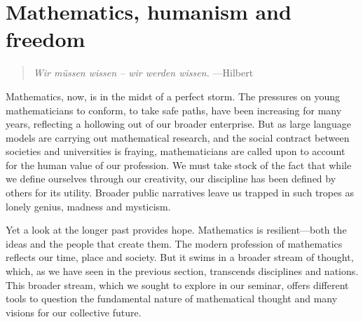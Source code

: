 \documentclass{article}
\begin{document}
    
  
    
%
%
%
%
%
    

%
%
%
%
%
%
  

%
%



%

   


%



%
%




 

 


%

 
%

%

%
%
%

 







 
%
%
%
%
%

%

 

 
\section{Mathematics, humanism and freedom} 
\begin{quote}
    {\em Wir m\"{u}ssen wissen – wir werden wissen.\/} ---Hilbert~\cite{hilbert_naturkennen}
\end{quote}
 

Mathematics, now, is in the midst of a perfect storm. The pressures on young mathematicians to conform, to take safe paths, have been increasing for many years, reflecting a hollowing out of our broader enterprise. But as large language models are carrying out mathematical research, and the social contract between societies and universities is fraying, mathematicians are called upon to account for the human value of our profession. We must take stock of the fact that while we define ourselves through our creativity, our discipline has been defined by others for its utility. Broader public narratives leave us trapped in such tropes as lonely genius, madness and mysticism.

 

 
Yet a look at the longer past provides hope. Mathematics is resilient---both the ideas and the people that create them. The modern profession of mathematics reflects our time, place and society. But it swims in a broader stream of thought, which, as we have seen in  the previous section, transcends disciplines and nations. This broader stream, which we sought to explore in our seminar, offers different tools to question the fundamental nature of mathematical thought and many visions for our collective future.
\end{document}

